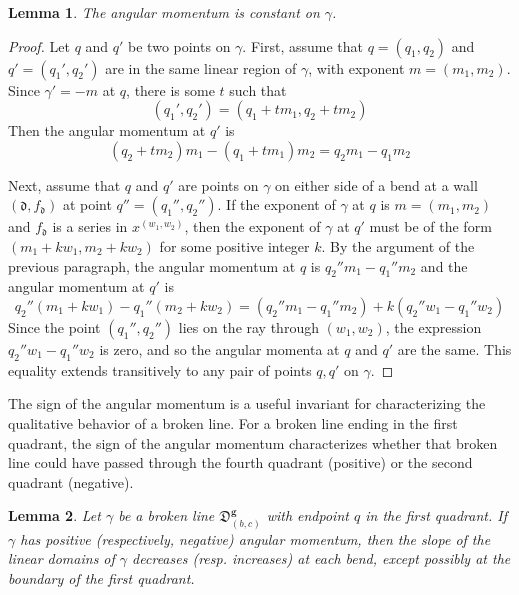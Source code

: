 \documentclass[11pt]{amsart}
\newtheorem{lemma}{Lemma}[section]
\theoremstyle{remark}
\numberwithin{equation}{section}
\newcommand{\fd}{\mathfrak{d}}
\begin{document}
\begin{lemma}
The angular momentum is constant on $\gamma$.
\end{lemma}
\begin{proof}
Let $q$ and $q'$ be two points on $\gamma$.
First, assume that $q=(q_1,q_2)$ and $q'=(q_1',q_2')$ are in the same linear region of $\gamma$, with exponent $m=(m_1,m_2)$.  Since $\gamma'=-m$ at $q$, there is some $t$ such that 
\[ (q_1',q_2') = (q_1+tm_1,q_2+tm_2) \]
Then the angular momentum at $q'$ is 
\[ (q_2+tm_2)m_1-(q_1+tm_1)m_2 = q_2m_1 - q_1m_2 \]

Next, assume that $q$ and $q'$ are points on $\gamma$ on either side of a bend at a wall $(\fd, f_{\fd})$ at point $q''=(q_1'',q_2'')$.  If the exponent of $\gamma$ at $q$ is $m=(m_1,m_2)$ and $f_{\fd}$ is a series in $x^{(w_1,w_2)}$, then the exponent of $\gamma$ at $q'$ must be of the form $(m_1+kw_1,m_2+kw_2)$ for some positive integer $k$.  By the argument of the previous paragraph, the angular momentum at $q$ is $q_2''m_1-q_1''m_2$
and the angular momentum at $q'$ is
\[ q_2''(m_1+kw_1)-q_1''(m_2+kw_2) = (q_2''m_1-q_1''m_2)+k(q_2''w_1-q_1''w_2) \]
Since the point $(q_1'',q_2'')$ lies on the ray through $(w_1,w_2)$, the expression $q_2''w_1-q_1''w_2$ is zero, and so the angular momenta at $q$ and $q'$ are the same.  This equality extends transitively to any pair of points $q,q'$ on $\gamma$.
\end{proof}
The sign of the angular momentum is a useful invariant for characterizing the qualitative behavior of a broken line.
For a broken line ending in the first quadrant, the sign of the angular momentum characterizes whether that broken line could have passed through the fourth quadrant (positive) or the second quadrant (negative).

\begin{lemma}
Let $\gamma$ be a broken line $\mathfrak{D}_{(b,c)}^{\mathbf{g}}$ with endpoint $q$ in the first quadrant. If $\gamma$ has positive (respectively, negative) angular momentum, then the slope of the linear domains of $\gamma$ decreases (resp. increases) at each bend, except possibly at the boundary of the first quadrant. 
\end{lemma}
\end{document}
